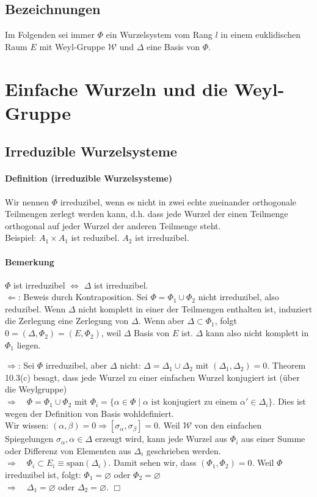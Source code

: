 \documentclass[a4paper,12pt]{article}
\begin{document}
\subsection{Bezeichnungen}
Im Folgenden sei immer $\Phi$ ein Wurzelsystem vom Rang $l$ in einem euklidischen Raum $E$ mit Weyl-Gruppe $\mathcal{W}$ und $\Delta$ eine Basis von $\Phi$.
\setcounter{section}{9}
\section{Einfache Wurzeln und die Weyl-Gruppe}
\setcounter{subsection}{3}
\subsection{Irreduzible Wurzelsysteme}
\paragraph{Definition (irreduzible Wurzelsysteme)} Wir nennen $\Phi$ irreduzibel, wenn es nicht in zwei echte zueinander orthogonale Teilmengen zerlegt werden kann, d.h. dass jede Wurzel der einen Teilmenge orthogonal auf jeder Wurzel der anderen Teilmenge steht.\\
Beispiel: $A_1 \times A_1$ ist reduzibel. $A_2$ ist irreduzibel.

\paragraph{Bemerkung} $\Phi$ ist irreduzibel $\Leftrightarrow$ $\Delta$ ist irreduzibel.\\
\glqq $\Leftarrow$\grqq: Beweis durch Kontraposition. Sei $\Phi = \Phi_1 \cup \Phi_2$ nicht irreduzibel, also reduzibel. Wenn $\Delta$ nicht komplett in einer der Teilmengen enthalten ist, induziert die Zerlegung eine Zerlegung von $\Delta$. Wenn aber $\Delta \subset \Phi_1$, folgt $0 = (\Delta,\Phi_2) = (E, \Phi_2)$, weil $\Delta$ Basis von $E$ ist.  $\Delta$ kann also nicht komplett in $\Phi_1$ liegen.

\glqq $\Rightarrow$\grqq: Sei $\Phi$ irreduzibel, aber $\Delta$ nicht: $\Delta = \Delta_1 \cup \Delta_2$ mit $(\Delta_1,\Delta_2) = 0$. Theorem 10.3(c) besagt, dass jede Wurzel zu einer einfachen Wurzel konjugiert ist (über die Weylgruppe)\\
$\Rightarrow \quad \Phi = \Phi_1 \cup \Phi_2$ mit $\Phi_i = \{ \alpha \in \Phi \;|\; \alpha \text{ ist konjugiert zu einem } \alpha' \in \Delta_i\}$. Dies ist wegen der Definition von Basis wohldefiniert. \\
Wir wissen: $(\alpha,\beta)=0 \Rightarrow [\sigma_\alpha, \sigma_\beta] = 0$. Weil $\mathcal{W}$ von den einfachen Spiegelungen $\sigma_\alpha, \alpha \in \Delta$ erzeugt wird, kann jede Wurzel aus $\Phi_i$ aus einer Summe oder Differenz von Elementen aus $\Delta_i$ geschrieben werden.\\
$\Rightarrow\quad \Phi_i \subset E_i \equiv \text{span}(\Delta_i)$. Damit sehen wir, dass $(\Phi_1,\Phi_2)=0$. Weil $\Phi$ irreduzibel ist, folgt: $\Phi_1 = \varnothing$ oder $\Phi_2 = \varnothing $ \\
$\Rightarrow\quad \Delta_1=\varnothing$ oder $\Delta_2 = \varnothing$.
\hfill$\Box$
\end{document}
